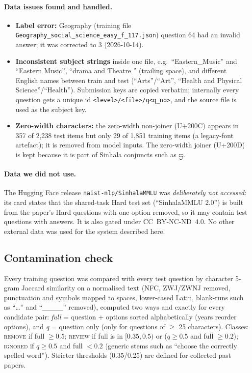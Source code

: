 \documentclass[10pt,a4paper]{article}
\newcommand{\si}[1]{{\sinhalafont #1}}
\begin{document}
\paragraph{Data issues found and handled.}
\begin{itemize}
\item \textbf{Label error:} Geography (training file \texttt{Geography\_social\_science\_easy\_f\_117.json}) question
64 had an invalid answer; it was corrected to 3 (2026-10-14).
\item \textbf{Inconsistent subject strings} inside one file, e.g.\ ``Eastern\_Music'' and ``Eastern Music'',
``drama and Theatre '' (trailing space), and different English names between train and test (``Arts''/``Art'',
``Health and Physical Science''/``Health''). Submission keys are copied verbatim; internally every question gets a
unique id \texttt{<level>/<file>/q<q\_no>}, and the source file is used as the subject key.
\item \textbf{Zero-width characters:} the zero-width non-joiner (U+200C) appears in 357 of 2,238 test items but only 29
of 1,851 training items (a legacy-font artefact); it is removed from model inputs. The zero-width joiner (U+200D) is
kept because it is part of Sinhala conjuncts such as \si{ප්‍ර}.
\end{itemize}

\paragraph{Data we did not use.} The Hugging Face release \texttt{naist-nlp/SinhalaMMLU} was \emph{deliberately not
accessed}: its card states that the shared-task Hard test set (``SinhalaMMLU 2.0'') is built from the paper's Hard
questions with one option removed, so it may contain test questions with answers. It is also gated under
CC~BY-NC-ND~4.0. No other external data was used for the system described here.

\subsection{Contamination check}
Every training question was compared with every test question by character 5-gram Jaccard similarity on a
normalised text (NFC, ZWJ/ZWNJ removed, punctuation and symbols mapped to spaces, lower-cased Latin, blank-runs
such as ``\ldots'' and ``\_\_\_\_'' removed), computed two ways and exactly for every candidate pair:
\emph{full} = question + options sorted alphabetically (years reorder options), and \emph{q} = question only (only for
questions of $\ge$ 25 characters). Classes: \textsc{remove} if full $\ge 0.5$; \textsc{review} if full is in
$[0.35, 0.5)$ or ($q \ge 0.5$ and full $\ge 0.2$); \textsc{ignored} if $q \ge 0.5$ and full $< 0.2$ (generic stems
such as ``choose the correctly spelled word''). Stricter thresholds (0.35/0.25) are defined for collected past papers.
\end{document}
